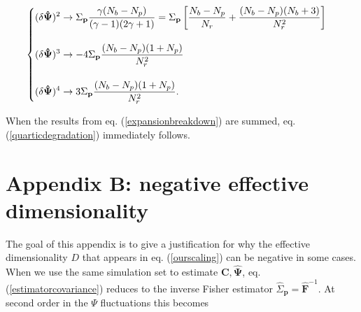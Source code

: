 \documentclass[reprint,aps,prd,superscriptaddress,showkeys,showpacs]{revtex4-1}
\newcommand{\bb}[1]{\mathbf{#1}}
\newcommand{\bbh}[1]{\mathbf{\hat{#1}}}
\newcommand{\h}[1]{\hat{#1}}
\begin{document}
\begin{widetext}
\begin{equation}
\label{expansionbreakdown}
\begin{cases}
\begin{displaystyle}
(\delta\bbh{\Psi})^2 \rightarrow \Sigma_\bb{p}\frac{\gamma(N_b-N_p)}{(\gamma-1)(2\gamma+1)} = \Sigma_\bb{p}\left[\frac{N_b-N_p}{N_r}+\frac{(N_b-N_p)(N_b+3)}{N_r^2}\right]
\end{displaystyle} \\ \\

\begin{displaystyle}
(\delta\bbh{\Psi})^3 \rightarrow -4\Sigma_\bb{p}\frac{(N_b-N_p)(1+N_p)}{N_r^2}
\end{displaystyle} \\ \\


\begin{displaystyle}
(\delta\bbh{\Psi})^4 \rightarrow 3\Sigma_\bb{p}\frac{(N_b-N_p)(1+N_p)}{N_r^2}.
\end{displaystyle}

\end{cases}
\end{equation}
\end{widetext}
%
When the results from eq. (\ref{expansionbreakdown}) are summed, eq. (\ref{quarticdegradation}) immediately follows. 


\clearpage
\newpage
\section*{Appendix B: negative effective dimensionality}
\label{appendixB}

The goal of this appendix is to give a justification for why the effective dimensionality $D$ that appears in eq. (\ref{ourscaling}) can be negative in some cases. When we use the same simulation set to estimate $\bb{C},\bbh{\Psi}$, eq. (\ref{estimatorcovariance}) reduces to the inverse Fisher estimator $\h{\Sigma}_\bb{p}=\bbh{F}^{-1}$. At second order in the $\Psi$ fluctuations this becomes
\end{document}
